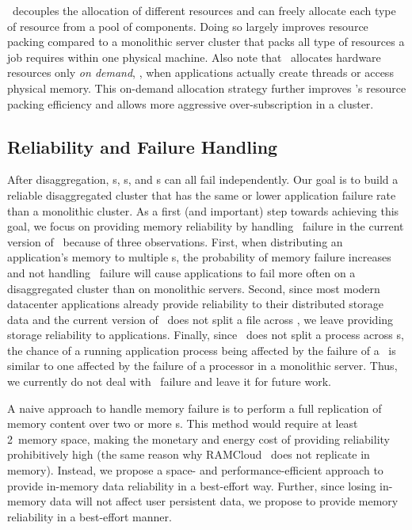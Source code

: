 \documentclass[10pt,times,twocolumn]{z2-article}
\begin{document}
{{{{{{{\lego\ decouples the allocation of different resources and 
can freely allocate each type of resource from a pool of components.
Doing so largely improves resource packing compared to a monolithic server cluster
that packs all type of resources a job requires within one physical machine.
Also note that \lego\ allocates hardware resources only {\em on demand}, 
\ie, when applications actually create threads or access physical memory.
This on-demand allocation strategy further improves \lego's resource packing efficiency
and allows more aggressive over-subscription in a cluster.

\subsection{Reliability and Failure Handling}
\label{sec:failure}
After disaggregation, \pcomponent{}s, \mcomponent{}s, and \scomponent{}s can all fail independently.
Our goal is to build a reliable disaggregated cluster that has the same or lower application failure rate
than a monolithic cluster.
As a first (and important) step towards achieving this goal, %
we focus on providing memory reliability by handling \mcomponent\ failure in the current version of \lego\ because of three observations.
First, when distributing an application's memory to multiple \mcomponent{}s, 
the probability of memory failure increases and not handling \mcomponent\ failure will cause applications to fail more often 
on a disaggregated cluster than on monolithic servers.
Second, since most modern datacenter applications
already provide reliability to their distributed storage data %
and the current version of \lego\ does not split a file across \scomponent,
we leave providing storage reliability to applications.
Finally, since \lego\ does not split a process across \pcomponent{}s,
the chance of a running application process being affected by the failure of a \pcomponent\ is similar to 
one affected by the failure of a processor in a monolithic server.
Thus, we currently do not deal with \pcomponent\ failure and leave it for future work.

A naive approach to handle memory failure is to perform a full replication of memory content over two or more \mcomponent{}s.
This method would require at least 2\x\ memory space,
making the monetary and energy cost of providing reliability prohibitively high (the same reason why RAMCloud~\cite{Ongaro11-RamCloud} does not replicate in memory).
Instead, we propose a space- and performance-efficient approach to provide in-memory data reliability in a best-effort way.
Further, since losing in-memory data will not affect user persistent data,
we propose to provide memory reliability in a best-effort manner.

}}}}}}}
\end{document}
